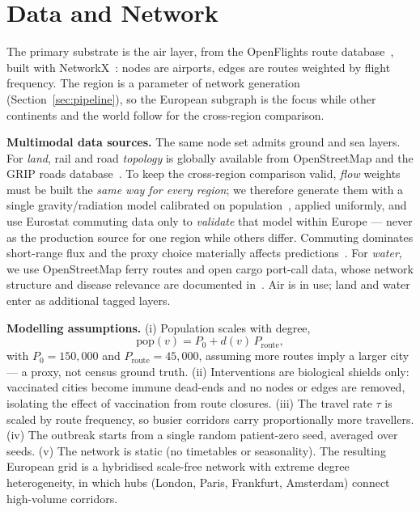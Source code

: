 \documentclass{sigkddExp}
\begin{document}
\section{Data and Network}
\label{sec:data}
The primary substrate is the air layer, from the OpenFlights route
database~\cite{openflights}, built with NetworkX~\cite{hagberg:networkx}:
nodes are airports, edges are routes weighted by flight frequency. The
region is a parameter of network generation (Section~\ref{sec:pipeline}),
so the European subgraph is the focus while other continents and the world
follow for the cross-region comparison.

\textbf{Multimodal data sources.} The same node set admits ground and sea
layers. For \emph{land}, rail and road \emph{topology} is globally available from
OpenStreetMap and the GRIP roads database~\cite{meijer:grip}. To keep the
cross-region comparison valid, \emph{flow} weights must be built the
\emph{same way for every region}; we therefore generate them with a single
gravity/radiation model calibrated on population~\cite{simini:radiation},
applied uniformly, and use Eurostat commuting data only to \emph{validate}
that model within Europe --- never as the production source for one region
while others differ. Commuting dominates short-range flux and the proxy
choice materially affects predictions~\cite{balcan:multiscale,tizzoni:proxies}.
For \emph{water}, we use OpenStreetMap ferry routes and open cargo
port-call data, whose network structure and disease relevance are
documented in~\cite{kaluza:cargo,seebens:bioinvasion,mari:cholera}. Air is
in use; land and water enter as additional tagged layers.

\textbf{Modelling assumptions.} (i) Population scales with degree,
\begin{equation}
\mathrm{pop}(v) = P_{0} + d(v)\,P_{\text{route}},
\end{equation}
with $P_{0}=150{,}000$ and $P_{\text{route}}=45{,}000$, assuming more routes
imply a larger city --- a proxy, not census ground truth. (ii) Interventions
are biological shields only: vaccinated cities become immune dead-ends and
no nodes or edges are removed, isolating the effect of vaccination from
route closures. (iii) The travel rate $\tau$ is scaled by route frequency,
so busier corridors carry proportionally more travellers. (iv) The outbreak
starts from a single random patient-zero seed, averaged over seeds. (v) The
network is static (no timetables or seasonality). The resulting European
grid is a hybridised scale-free network with extreme degree heterogeneity,
in which hubs (London, Paris, Frankfurt, Amsterdam) connect high-volume
corridors.
\end{document}
